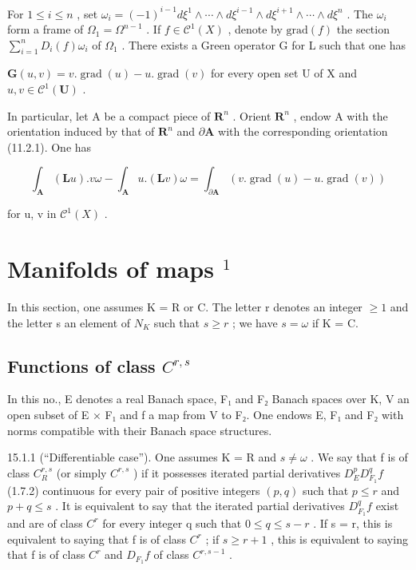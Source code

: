 For \(1 \leqslant i \leqslant n\) , set \(\omega_{i} = (-1)^{i-1} d\xi^{1} \wedge \cdots \wedge d\xi^{i-1} \wedge d\xi^{i+1} \wedge \cdots \wedge d\xi^{n}\) . The \(\omega_{i}\) form a frame of \(\Omega_{1} = \Omega^{n-1}\) . If \(f \in \mathcal{C}^{1}(X)\) , denote by \(\text{grad}(f)\) the section \(\sum_{i=1}^{n} D_{i}(f)\omega_{i}\) of \(\Omega_{1}\) . There exists a Green operator G for L such that one has

\(\mathbf{G}(u,v) = v.\operatorname{grad}(u) - u.\operatorname{grad}(v)\) for every open set U of X and \(u,v \in \mathcal{C}^{1}(\mathbf{U})\) .

In particular, let A be a compact piece of \(\mathbf{R}^{n}\) . Orient \(\mathbf{R}^{n}\) , endow A with the orientation induced by that of \(\mathbf{R}^{n}\) and \(\partial\mathbf{A}\) with the corresponding orientation (11.2.1). One has

\[
\int_ {\mathbf {A}} (\mathbf {L} u). v \omega - \int_ {\mathbf {A}} u. (\mathbf {L} v) \omega = \int_ {\partial \mathbf {A}} (v. \operatorname{grad} (u) - u. \operatorname{grad} (v))
\]

for u, v in \(\mathcal{C}^{1}(X)\) .

\section{\texorpdfstring{Manifolds of maps \(^{1}\)}{Manifolds of maps ¹}}

In this section, one assumes K = R or C. The letter r denotes an integer \(\geqslant 1\) and the letter s an element of \(N_{K}\) such that \(s \geqslant r\) ; we have \(s = \omega\) if K = C.

\subsection{\texorpdfstring{Functions of class \(C^{r,s}\)}{Functions of class C\^{}\{r,s\}}}

In this no., E denotes a real Banach space, F₁ and F₂ Banach spaces over K, V an open subset of E × F₁ and f a map from V to F₂. One endows E, F₁ and F₂ with norms compatible with their Banach space structures.

15.1.1 (“Differentiable case”). One assumes K = R and \(s \neq \omega\) . We say that f is of class \(C_{R}^{r,s}\) (or simply \(C^{r,s}\) ) if it possesses iterated partial derivatives \(D_{E}^{p}D_{F_{1}}^{q}f\) (1.7.2) continuous for every pair of positive integers \((p,q)\) such that \(p \leqslant r\) and \(p + q \leqslant s\) . It is equivalent to say that the iterated partial derivatives \(D_{F_{1}}^{q}f\) exist and are of class \(C^{r}\) for every integer q such that \(0 \leqslant q \leqslant s - r\) . If s = r, this is equivalent to saying that f is of class \(C^{r}\) ; if \(s \geqslant r + 1\) , this is equivalent to saying that f is of class \(C^{r}\) and \(D_{F_{1}}f\) of class \(C^{r,s-1}\) .

